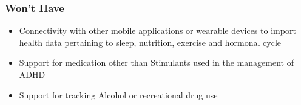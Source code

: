 \documentclass[../main.tex]{subfiles}
\begin{document}
\subsubsection*{Won't Have}
\begin{itemize}
   \item Connectivity with other mobile applications or wearable devices to import health data pertaining to sleep, nutrition, exercise and hormonal cycle
   \item Support for medication other than Stimulants used in the management of ADHD
   \item Support for tracking Alcohol or recreational drug use
\end{itemize}


\clearpage
\end{document}
